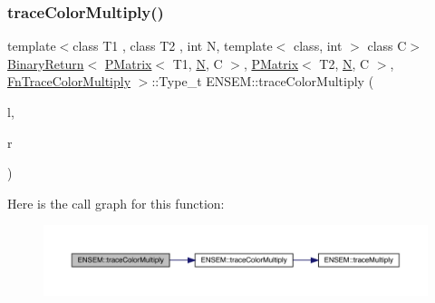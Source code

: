 \subsubsection{\texorpdfstring{traceColorMultiply()}{traceColorMultiply()}\hspace{0.1cm}{\footnotesize\ttfamily [1/3]}}
{\footnotesize\ttfamily template$<$class T1 , class T2 , int N, template$<$ class, int $>$ class C$>$ \\
\mbox{\hyperlink{structENSEM_1_1BinaryReturn}{Binary\+Return}}$<$ \mbox{\hyperlink{classENSEM_1_1PMatrix}{P\+Matrix}}$<$ T1, \mbox{\hyperlink{operator__name__util_8cc_a7722c8ecbb62d99aee7ce68b1752f337}{N}}, C $>$, \mbox{\hyperlink{classENSEM_1_1PMatrix}{P\+Matrix}}$<$ T2, \mbox{\hyperlink{operator__name__util_8cc_a7722c8ecbb62d99aee7ce68b1752f337}{N}}, C $>$, \mbox{\hyperlink{structENSEM_1_1FnTraceColorMultiply}{Fn\+Trace\+Color\+Multiply}} $>$\+::Type\+\_\+t E\+N\+S\+E\+M\+::trace\+Color\+Multiply (\begin{DoxyParamCaption}\item[{const \mbox{\hyperlink{classENSEM_1_1PMatrix}{P\+Matrix}}$<$ T1, \mbox{\hyperlink{operator__name__util_8cc_a7722c8ecbb62d99aee7ce68b1752f337}{N}}, C $>$ \&}]{l,  }\item[{const \mbox{\hyperlink{classENSEM_1_1PMatrix}{P\+Matrix}}$<$ T2, \mbox{\hyperlink{operator__name__util_8cc_a7722c8ecbb62d99aee7ce68b1752f337}{N}}, C $>$ \&}]{r }\end{DoxyParamCaption})\hspace{0.3cm}{\ttfamily [inline]}}

Here is the call graph for this function\+:\nopagebreak
\begin{figure}[H]
\begin{center}
\leavevmode
\includegraphics[width=350pt]{df/d0a/group__primmatrix_ga017dba078c2a41f5ca2a8d2b934b20aa_cgraph}
\end{center}
\end{figure}
\mbox{\label{group__primmatrix_ga34f5dfd94ab05f405e04e73c9e342aeb}} 
